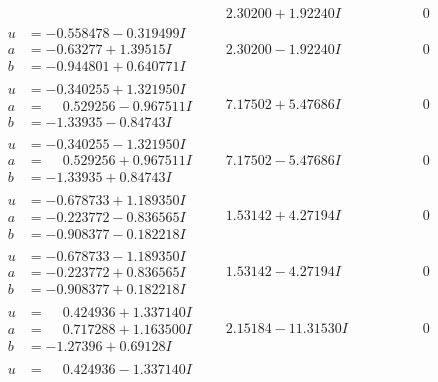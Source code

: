 \documentclass[1p]{elsarticle_modified}
\theoremstyle{definition}
\begin{document}
$$\begin{array}{c|c|c}
 & \phantom{-}2.30200 + 1.92240 I & \phantom{-0.000000 } 0 \\ \hline\begin{aligned}
u &= -0.558478 - 0.319499 I \\
a &= -0.63277 + 1.39515 I \\
b &= -0.944801 + 0.640771 I\end{aligned}
 & \phantom{-}2.30200 - 1.92240 I & \phantom{-0.000000 } 0 \\ \hline\begin{aligned}
u &= -0.340255 + 1.321950 I \\
a &= \phantom{-}0.529256 - 0.967511 I \\
b &= -1.33935 - 0.84743 I\end{aligned}
 & \phantom{-}7.17502 + 5.47686 I & \phantom{-0.000000 } 0 \\ \hline\begin{aligned}
u &= -0.340255 - 1.321950 I \\
a &= \phantom{-}0.529256 + 0.967511 I \\
b &= -1.33935 + 0.84743 I\end{aligned}
 & \phantom{-}7.17502 - 5.47686 I & \phantom{-0.000000 } 0 \\ \hline\begin{aligned}
u &= -0.678733 + 1.189350 I \\
a &= -0.223772 - 0.836565 I \\
b &= -0.908377 - 0.182218 I\end{aligned}
 & \phantom{-}1.53142 + 4.27194 I & \phantom{-0.000000 } 0 \\ \hline\begin{aligned}
u &= -0.678733 - 1.189350 I \\
a &= -0.223772 + 0.836565 I \\
b &= -0.908377 + 0.182218 I\end{aligned}
 & \phantom{-}1.53142 - 4.27194 I & \phantom{-0.000000 } 0 \\ \hline\begin{aligned}
u &= \phantom{-}0.424936 + 1.337140 I \\
a &= \phantom{-}0.717288 + 1.163500 I \\
b &= -1.27396 + 0.69128 I\end{aligned}
 & \phantom{-}2.15184 - 11.31530 I & \phantom{-0.000000 } 0 \\ \hline\begin{aligned}
u &= \phantom{-}0.424936 - 1.337140 I \\

\end{aligned}
\end{array}$$
\end{document}
